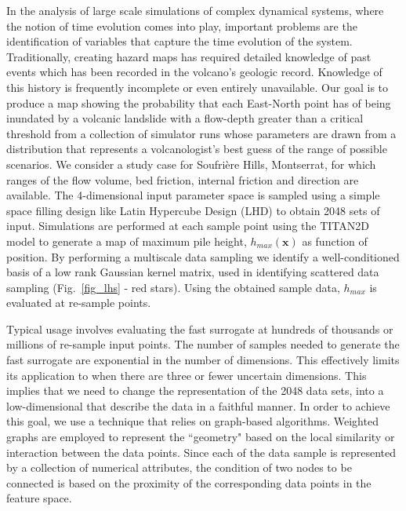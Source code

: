 \documentclass[12pt,letterpaper]{article}
\begin{document}
In the analysis of large scale simulations of complex dynamical systems, where the notion of time evolution comes into play, important problems 
are the identification of variables that capture the time evolution of the system. Traditionally, creating hazard maps has required detailed knowledge 
of past events which has been recorded in the volcano's geologic record. Knowledge of this history is frequently incomplete or even entirely unavailable.
Our goal is to produce a map showing the probability that each East-North point has of being inundated by a volcanic landslide with a flow-depth greater than a critical threshold from a collection of simulator runs whose parameters are drawn from a distribution that represents a volcanologist's best guess of the range of possible scenarios. We consider a study case for Soufri\`ere Hills, Montserrat, for which ranges of the flow volume, bed friction, internal friction and direction are available.
The 4-dimensional input parameter space is sampled using a simple space filling design like Latin Hypercube Design (LHD) to obtain 2048 sets of input. Simulations are performed at each sample point using the TITAN2D model to generate a map of maximum pile height, $h_{max}(\textbf{x})$ as function of position.
By performing a multiscale data sampling we identify a well-conditioned basis of a low rank Gaussian kernel matrix, used in identifying scattered data sampling (Fig.~\ref{fig_lhs} - red stars). Using the obtained sample data, $h_{max}$ is evaluated at re-sample points.

Typical usage involves evaluating the fast surrogate at hundreds of thousands or millions of re-sample input points. The number of samples needed to generate the fast surrogate are exponential in the number of dimensions. This effectively limits its application to when there are three or fewer uncertain dimensions. This implies that we need to change the representation of the 2048 data sets, into a low-dimensional that describe the data in a faithful manner. In order to achieve this goal, we use a technique that relies on graph-based algorithms. Weighted graphs are employed to represent the ``geometry" based on the local similarity or interaction between the data points. Since each of the data sample is represented by a collection of numerical attributes, the condition of two nodes to be connected is based on the proximity of the corresponding data points in the feature space.
\end{document}
